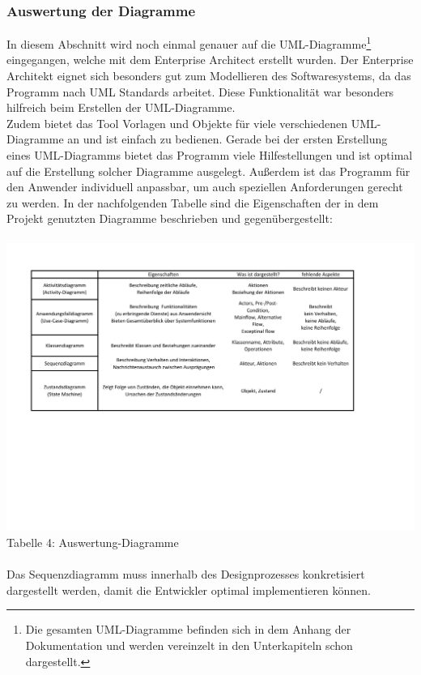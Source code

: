 \documentclass[12pt,a4paper]{article}
\begin{document}
\subsubsection*{Auswertung der Diagramme}
In diesem Abschnitt wird noch einmal genauer auf die UML-Diagramme\footnote{Die gesamten UML-Diagramme befinden sich in dem Anhang der Dokumentation und werden vereinzelt in den Unterkapiteln schon dargestellt.} eingegangen, welche mit dem Enterprise Architect erstellt wurden. Der Enterprise Architekt eignet sich besonders gut zum Modellieren des Softwaresystems, da das Programm nach UML Standards arbeitet. Diese Funktionalität war besonders hilfreich beim Erstellen der UML-Diagramme. 
\\
Zudem bietet das Tool Vorlagen und Objekte für viele verschiedenen UML-Diagramme an und ist einfach zu bedienen. Gerade bei der ersten Erstellung eines UML-Diagramms bietet das Programm viele Hilfestellungen und ist optimal auf die Erstellung solcher Diagramme ausgelegt. Außerdem ist das Programm für den Anwender individuell anpassbar, um auch speziellen Anforderungen gerecht zu werden.
\newpage
In der nachfolgenden Tabelle sind die Eigenschaften der in dem Projekt  genutzten Diagramme beschrieben und gegenübergestellt:
\\
\\
\hspace*{-10mm} 
\includegraphics[trim = 10mm 60mm 0mm 20mm,clip,scale=0.7]{Auswertung_Diagramme.pdf}
\footnotesize Tabelle 4: Auswertung-Diagramme
\normalsize
\\
\\
Das Sequenzdiagramm muss innerhalb des Designprozesses konkretisiert dargestellt werden, damit die Entwickler optimal implementieren können.
\end{document}
